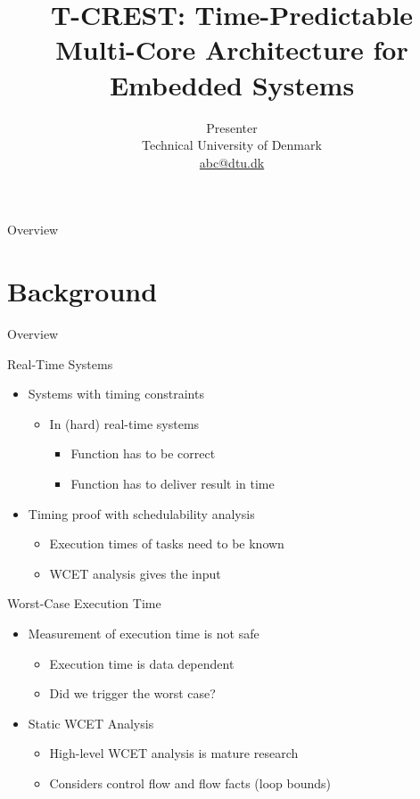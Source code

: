 \documentclass[17pt]{beamer}
\author[Presenter, DTU]{Presenter\\Technical University of Denmark\\\href{mailto:abc@dtu.dk}{abc@dtu.dk}}
\title{T-CREST: Time-Predictable Multi-Core Architecture for Embedded Systems}
\begin{document}
\maketitle

\begin{frame}{Overview}
  \tableofcontents
\end{frame}

\section{Background}

\begin{frame}{Overview}
  \tableofcontents[currentsection]
\end{frame}

\begin{frame}{Real-Time Systems}
  \begin{itemize}
  \item Systems with timing constraints
    \begin{itemize}
    \item In (hard) real-time systems
      \begin{itemize}
      \item Function has to be correct
      \item Function has to deliver result in time
      \end{itemize}
    \end{itemize}
  \item Timing proof with schedulability analysis
    \begin{itemize}
    \item Execution times of tasks need to be known
    \item WCET analysis gives the input
    \end{itemize}
  \end{itemize}  
\end{frame}

\begin{frame}{Worst-Case Execution Time}
  \begin{itemize}
  \item Measurement of execution time is not safe
    \begin{itemize}
    \item Execution time is data dependent
    \item Did we trigger the worst case?
    \end{itemize}
  \item Static WCET Analysis
    \begin{itemize}
    \item High-level WCET analysis is mature research
    \item Considers control flow and flow facts (loop bounds)      
    \end{itemize}
  \end{itemize}
\end{frame}
\end{document}
